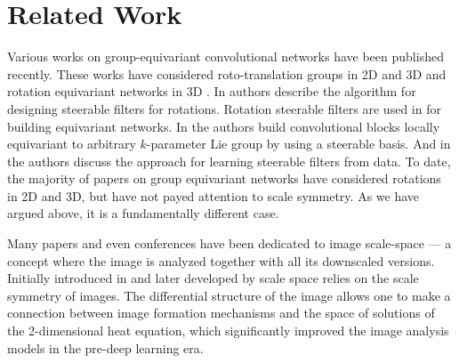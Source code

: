 \documentclass{article} \usepackage{multirow}
\begin{document}
     \section{Related Work}
\label{sec:related}
Various works on group-equivariant convolutional networks have been published recently. 
These works have considered roto-translation groups in 2D \citet{cohen2016group,hoogeboom2018hexaconv,worrall2017harmonic,weiler2019general}
and 3D \cite{worrall2018cubenet,kondor2018n,thomas2018tensor} and rotation equivariant networks in 3D 
\citet{cohen2017convolutional,esteves2018learning,cohen2019gauge}. In \citet{freeman1991design} authors describe the 
algorithm for designing steerable filters for rotations. Rotation steerable filters are used in
\citet{cohen2016steerable,weiler20183d,weiler2018learning} for building equivariant networks. In \citet{jacobsen2017dynamic} the authors build convolutional blocks locally equivariant to arbitrary $k$-parameter Lie group by using a steerable basis. And in \citet{muruganso} the authors discuss the approach for learning steerable filters from data.
To date, the majority of papers on group equivariant networks have considered rotations in 2D and 3D, but have not 
payed attention to scale symmetry. As we have argued above, it is a fundamentally
different case.

Many papers and even conferences have been dedicated to image scale-space --- a concept where the image is analyzed
together with all its downscaled versions. Initially introduced in \citet{iijima1959basic} and later developed
by \citet{witkin1987scale,perona1990scale,lindeberg2013scale} scale space relies on the scale symmetry of images. 
The differential structure of the image \citet{koenderink1984structure} allows one to make a connection 
between image formation mechanisms and the space of solutions of the 2-dimensional heat equation, which 
significantly improved the image analysis models in the pre-deep learning era. 
\end{document}

